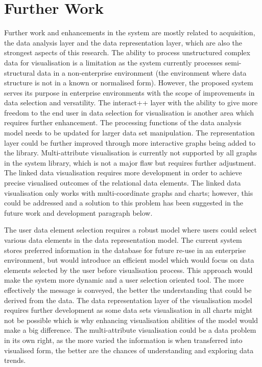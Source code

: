 \section{Further Work}

Further work and enhancements in the system are mostly related to acquisition, the data analysis layer and the data representation layer, which are also the strongest aspects of this research. The ability to process unstructured complex data for visualisation is a limitation as the system currently processes semi-structural data in a non-enterprise environment (the environment where data structure is not in a known or normalised form). However, the proposed system serves its purpose in enterprise environments with the scope of improvements in data selection and versatility. The interact++ layer with the ability to give more freedom to the end user in data selection for visualisation is another area which requires further enhancement. The processing functions of the data analysis model needs to be updated for larger data set manipulation. The representation layer could be further improved through more interactive graphs being added to the library. Multi-attribute visualisation is currently not supported by all graphs in the system library, which is not a major flaw but requires further adjustment. The linked data visualisation requires more development in order to achieve precise visualised outcomes of the relational data elements. The linked data visualisation only works with multi-coordinate graphs and charts; however, this could be addressed and a solution to this problem has been suggested in the future work and development paragraph below.

The user data element selection requires a robust model where users could select various data elements in the data representation model. The current system stores preferred information in the database for future re-use in an enterprise environment, but would introduce an efficient model which would focus on data elements selected by the user before visualisation process. This approach would make the system more dynamic and a user selection oriented tool. The more effectively the message is conveyed, the better the understanding that could be derived from the data. The data representation layer of the visualisation model requires further development as some data sets visualisation in all charts might not be possible which is why enhancing visualisation abilities of the model would make a big difference. The multi-attribute visualisation could be a data problem in its own right, as the more varied the information is when transferred into visualised form, the better are the chances of understanding and exploring data trends. 

